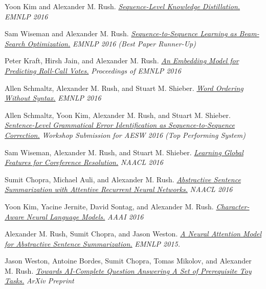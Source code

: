 \documentclass[10pt]{article}
\begin{document}
\ind Yoon Kim and Alexander M. Rush. \emph{\href{ http://arxiv.org/pdf/1606.07947v1.pdf }{ Sequence-Level Knowledge Distillation.} }\emph{ EMNLP 2016 }

\medskip


\ind Sam Wiseman and Alexander M. Rush. \emph{\href{ http://arxiv.org/pdf/1606.02960.pdf }{ Sequence-to-Sequence Learning as Beam-Search Optimization.} }\emph{ EMNLP 2016 (Best Paper Runner-Up) }

\medskip


\ind Peter Kraft, Hirsh Jain, and Alexander M. Rush. \emph{\href{ https://www.aclweb.org/anthology/D/D16/D16-1221.pdf }{ An Embedding Model for Predicting Roll-Call Votes.} }\emph{ Proceedings of EMNLP 2016 }

\medskip


\ind Allen Schmaltz, Alexander M. Rush, and Stuart M. Shieber. \emph{\href{ https://arxiv.org/abs/1604.08633 }{ Word Ordering Without Syntax.} }\emph{ EMNLP 2016 }

\medskip


\ind Allen Schmaltz, Yoon Kim, Alexander M. Rush, and Stuart M. Shieber. \emph{\href{ /papers/aesw2016.pdf }{ Sentence-Level Grammatical Error Identification as Sequence-to-Sequence Correction.} }\emph{ Workshop Submission for AESW 2016 (Top Performing System) }

\medskip


\ind Sam Wiseman, Alexander M. Rush, and Stuart M. Shieber. \emph{\href{ /papers/corefmain.pdf }{ Learning Global Features for Coreference Resolution.} }\emph{ NAACL 2016 }

\medskip


\ind Sumit Chopra, Michael Auli, and Alexander M. Rush. \emph{\href{ /papers/naacl16_summary.pdf }{ Abstractive Sentence Summarization with Attentive Recurrent Neural Networks.} }\emph{ NAACL 2016 }

\medskip


\ind Yoon Kim, Yacine Jernite, David Sontag, and Alexander M. Rush. \emph{\href{ https://arxiv.org/pdf/1508.06615v4 }{ Character-Aware Neural Language Models.} }\emph{ AAAI 2016 }

\medskip


\ind Alexander M. Rush, Sumit Chopra, and Jason Weston. \emph{\href{ http://arxiv.org/pdf/1509.00685.pdf }{ A Neural Attention Model for Abstractive Sentence Summarization.} }\emph{ EMNLP 2015. }

\medskip


\ind Jason Weston, Antoine Bordes, Sumit Chopra, Tomas Mikolov, and Alexander M. Rush. \emph{\href{ http://arxiv.org/pdf/1502.05698.pdf }{ Towards AI-Complete Question Answering A Set of Prerequisite Toy Tasks.} }\emph{ ArXiv Preprint }
\end{document}
